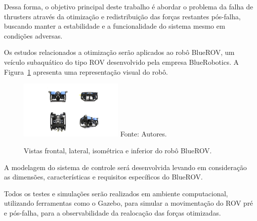 \documentclass[../main.tex]{subfiles}
\begin{document}
Dessa forma, o objetivo principal deste trabalho é abordar o problema da falha de thrusters através da otimização e redistribuição das forças restantes pós-falha, buscando manter a estabilidade e a funcionalidade do sistema mesmo em condições adversas.

Os estudos relacionados a otimização serão aplicados ao robô BlueROV, um veículo subaquático do tipo ROV desenvolvido pela empresa BlueRobotics. A Figura~\ref{rov_view} apresenta uma representação visual do robô.

\begin{figure}[!htb]
  \centering
  \caption{Vistas frontal, lateral, isométrica e inferior do robô BlueROV.}
  \includegraphics[width=0.45\textwidth]{images/vistas_bluerov (1) .png}
  \vfill
  Fonte: Autores.
  \label{rov_view}
\end{figure}

A modelagem do sistema de controle será desenvolvida levando em consideração as dimensões, características e requisitos específicos do BlueROV. 

Todos os testes e simulações serão realizados em ambiente computacional, utilizando ferramentas como o Gazebo, para simular a movimentação do ROV pré e pós-falha, para a observabilidade da realocação das forças otimizadas.
\end{document}
